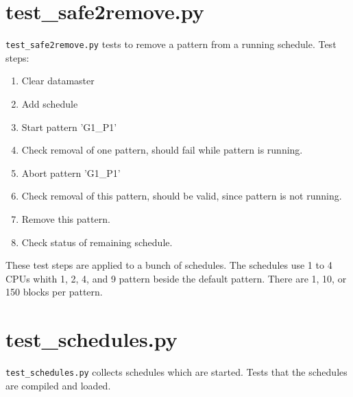 \documentclass[12pt,a4paper]{report}
\begin{document}
\section{test\_safe2remove.py}
\texttt{test\_safe2remove.py} tests to remove a pattern from a running schedule. Test steps:
\begin{enumerate}
\item Clear datamaster
\item Add schedule
\item Start pattern 'G1\_P1'
\item Check removal of one pattern, should fail while pattern is running.
\item Abort pattern 'G1\_P1'
\item Check removal of this pattern, should be valid, since pattern is not running.
\item Remove this pattern.
\item Check status of remaining schedule.
\end{enumerate}
These test steps are applied to a bunch of schedules.
The schedules use 1 to 4 CPUs whith 1, 2, 4, and 9 pattern beside the default pattern. There are 1, 10, or 150 blocks per pattern.
\section{test\_schedules.py}
\texttt{test\_schedules.py} collects schedules which are started. Tests that the schedules are compiled and loaded.


\end{document}
